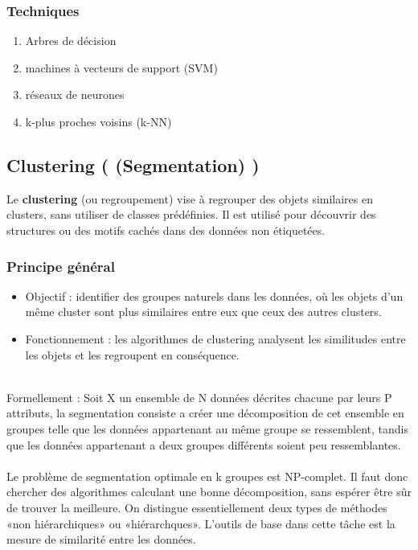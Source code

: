 \documentclass[a4paper,12pt]{report}
\begin{document}
        \subsubsection*{Techniques}

        \begin{enumerate}[label=\alph*)]
            \item Arbres de décision
            
            \item machines à vecteurs de support (SVM)
            
            \item réseaux de neurones
            
            \item k-plus proches voisins (k-NN)
            
        \end{enumerate}

        \subsection{Clustering ( (Segmentation) )}
        
        Le \textbf{clustering} (ou regroupement) vise à regrouper des objets similaires en clusters, sans utiliser de classes prédéfinies. Il est utilisé pour découvrir des structures ou des motifs cachés dans des données non étiquetées.
        
        \subsubsection*{Principe général}
        
        \begin{itemize}
            \item  Objectif : identifier des groupes naturels dans les données, où les objets d’un même cluster sont plus similaires entre eux que ceux des autres clusters.
            \item  Fonctionnement : les algorithmes de clustering analysent les similitudes entre les objets et les regroupent en conséquence.
        \end{itemize}
        {\\}
        Formellement : Soit X un ensemble de N données décrites chacune par leurs P
        attributs, la segmentation consiste a créer une décomposition de cet ensemble
        en groupes telle que les données appartenant au même groupe se ressemblent,
        tandis que les données appartenant a deux groupes différents soient peu
        ressemblantes.{\\}{\\}
        Le problème de segmentation optimale en k groupes est NP-complet. Il faut
        donc chercher des algorithmes calculant une bonne décomposition, sans
        espérer être sûr de trouver la meilleure. On distingue essentiellement deux 
        types de méthodes «non hiérarchiques» ou «hiérarchques».
        L’outils de base dans cette tâche est la mesure de similarité entre les données.
        
\end{document}
